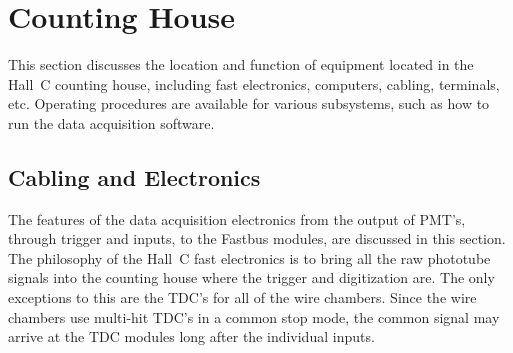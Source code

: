 
\section{Counting House}

This section discusses the location and function of equipment located in the
Hall~C counting house, including fast electronics, computers, cabling,
terminals, etc.
Operating procedures are available for various subsystems, such as how to
run the data acquisition software.

\subsection{Cabling and Electronics}

The features of the data acquisition
electronics from the output of PMT's, through trigger and inputs, to
the Fastbus modules, are discussed in this section.
The philosophy of the Hall~C fast electronics is to bring all the
raw phototube signals into the counting house where the trigger and
digitization are. The only exceptions to this are the TDC's for all of
the wire chambers. Since the wire chambers use multi-hit TDC's in a
common stop mode, the common signal may arrive at the TDC modules long
after the individual inputs.

